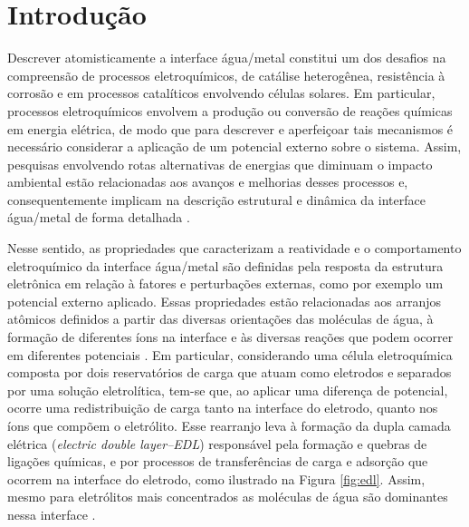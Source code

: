 \chapter*[Introdução]{Introdução} 


Descrever atomisticamente a interface água/metal constitui um dos desafios na compreensão de processos eletroquímicos, de catálise heterogênea, resistência à corrosão e em processos catalíticos envolvendo células solares. Em particular, processos eletroquímicos envolvem a produção ou conversão de reações químicas em energia elétrica, de modo que para descrever e aperfeiçoar tais mecanismos é necessário considerar a aplicação de um potencial externo sobre o sistema. Assim, pesquisas envolvendo rotas alternativas de energias que diminuam o impacto ambiental estão relacionadas aos avanços e melhorias desses processos e, consequentemente implicam na descrição estrutural e dinâmica da interface água/metal de forma detalhada \cite{bias-pd,contex-nature}.   

Nesse sentido, as propriedades que caracterizam a reatividade e o comportamento eletroquímico da interface água/metal são definidas pela resposta da estrutura eletrônica em relação à fatores e perturbações externas, como por exemplo um potencial externo aplicado. Essas propriedades estão relacionadas aos arranjos atômicos definidos a partir das diversas orientações das moléculas de água, à formação de diferentes íons na interface e às diversas reações que podem ocorrer em diferentes potenciais \cite{bias-pd}. Em particular, considerando uma célula eletroquímica composta por dois reservatórios de carga que atuam como eletrodos e separados por uma solução eletrolítica, tem-se que, ao aplicar uma diferença de potencial, ocorre uma redistribuição de carga tanto na interface do eletrodo, quanto nos íons que compõem o eletrólito. Esse rearranjo leva à formação da dupla camada elétrica (\textit{electric double layer--EDL}) responsável pela formação e quebras de ligações químicas, e por processos de transferências de carga e adsorção que ocorrem na interface do eletrodo, como ilustrado na Figura \ref{fig:edl}. Assim, mesmo para eletrólitos mais concentrados as moléculas de água são dominantes nessa interface \cite{electro_curcinotta}. 


